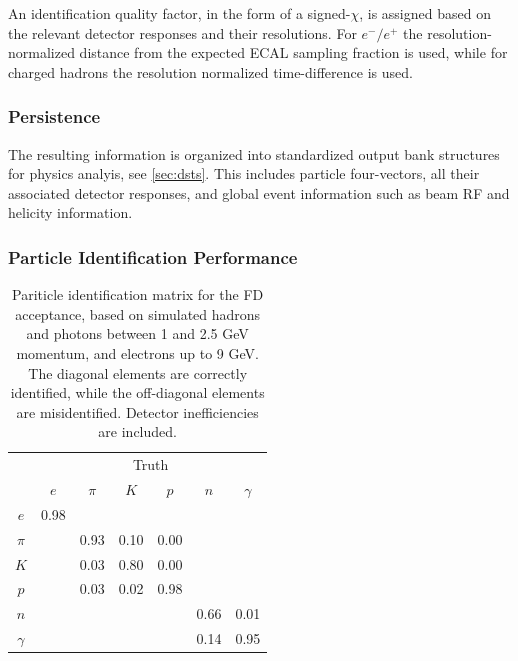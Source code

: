 An identification quality factor, in the form of a signed-$\chi$, is assigned based on the relevant detector responses and their resolutions.  For $e^-/e^+$ the resolution-normalized distance from the expected ECAL sampling fraction is used, while for charged hadrons the resolution normalized time-difference is used.

\subsubsection{Persistence}
The resulting information is organized into standardized output bank structures for physics analyis, see \ref{sec:dsts}.  This includes particle four-vectors, all their associated detector responses, and global event information such as beam RF and helicity information.


\subsubsection{Particle Identification Performance}

\begin{table}[htpb]
  \begin{center}
    \label{tab:pidmatrix}
    \begin{tabular}{|c|cccccc|}\hline
          & \multicolumn{6}{c|}{Truth}\\        
          & $e$  & $\pi$ & $K$  & $p$  & $n$  & $\gamma$ \\\hline
  $e$     & 0.98 &       &      &      &      &          \\ 
  $\pi$   &      &  0.93 & 0.10 & 0.00 &      &          \\ 
  $K$     &      &  0.03 & 0.80 & 0.00 &      &          \\ 
  $p$     &      &  0.03 & 0.02 & 0.98 &      &          \\ 
  $n$     &      &       &      &      & 0.66 &   0.01   \\ 
 $\gamma$ &      &       &      &      & 0.14 &   0.95   \\\hline 
    \end{tabular}
  \caption{Pariticle identification matrix for the FD acceptance, based on simulated hadrons and photons between 1 and 2.5 GeV momentum, and electrons up to 9 GeV.  The diagonal elements are correctly identified, while the off-diagonal elements are misidentified.  Detector inefficiencies are included.}
  \end{center}
\end{table}

